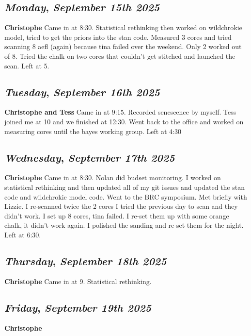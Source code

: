 \def\day{\textit{September 15th 2025}}
\def\weekday{\textit{Monday}}
\subsection*{\weekday, \day}
\textbf {Christophe}
Came in at 8:30. Statistical rethinking then worked on wildchrokie model, tried to get the priors into the stan code. Measured 3 cores and tried scanning 8 aefl (again) because tina failed over the weekend. Only 2 worked out of 8. Tried the chalk on two cores that couldn't get stitched and launched the scan. Left at 5. 

\def\day{\textit{September 16th 2025}}
\def\weekday{\textit{Tuesday}}
\subsection*{\weekday, \day}
\textbf {Christophe and Tess}
Came in at 9:15. Recorded senescence by myself. Tess joined me at 10 and we finished at 12:30. Went back to the office and worked on measuring cores until the bayes working group. Left at 4:30\

\def\day{\textit{September 17th 2025}}
\def\weekday{\textit{Wednesday}}
\subsection*{\weekday, \day}
\textbf {Christophe}
Came in at 8:30. Nolan did budset monitoring. I worked on statistical rethinking and then updated all of my git issues and updated the stan code and wildchrokie model code. Went to the BRC symposium. Met briefly with Lizzie. I re-scanned twice the 2 cores I tried the previous day to scan and they didn't work. I set up 8 cores, tina failed. I re-set them up with some orange chalk, it didn't work again. I polished the sanding and re-set them for the night. Left at 6:30. 

\def\day{\textit{September 18th 2025}}
\def\weekday{\textit{Thursday}}
\subsection*{\weekday, \day}
\textbf {Christophe}
Came in at 9. Statistical rethinking. 
\def\day{\textit{September 19th 2025}}
\def\weekday{\textit{Friday}}
\subsection*{\weekday, \day}
\textbf {Christophe}

